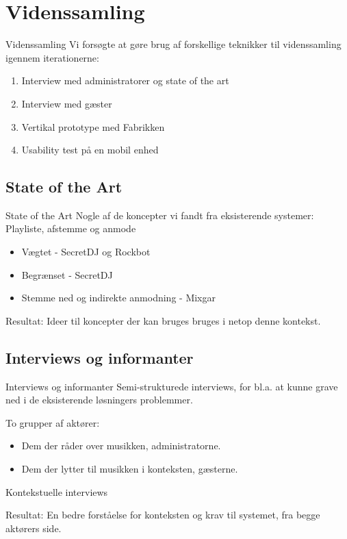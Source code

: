 \section{Videnssamling}
\begin{frame}{Videnssamling}
Vi forsøgte at gøre brug af forskellige teknikker til videnssamling igennem iterationerne:
\begin{enumerate}
\item Interview med administratorer og state of the art
\item Interview med gæster
\item Vertikal prototype med Fabrikken
\item Usability test på en mobil enhed
\end{enumerate}
\end{frame}

\subsection{State of the Art}
\begin{frame}{State of the Art}
	Nogle af de koncepter vi fandt fra eksisterende systemer:
	Playliste, afstemme og anmode
	\begin{itemize}
	\item Vægtet - SecretDJ og Rockbot
	\item Begrænset - SecretDJ
	\item Stemme ned og indirekte anmodning - Mixgar
	\end{itemize}

	Resultat: Ideer til koncepter der kan bruges bruges i netop denne kontekst.
\end{frame}
\subsection{Interviews og informanter}
\begin{frame}{Interviews og informanter}
	Semi-strukturede interviews, for bl.a. at kunne grave ned i de eksisterende løsningers problemmer.

	To grupper af aktører:
	\begin{itemize}
		\item Dem der råder over musikken, administratorne.
		\item Dem der lytter til musikken i konteksten, gæsterne.
	\end{itemize}

	Kontekstuelle interviews
	
	Resultat: En bedre forståelse for konteksten og krav til systemet, fra begge aktørers side.
\end{frame}
